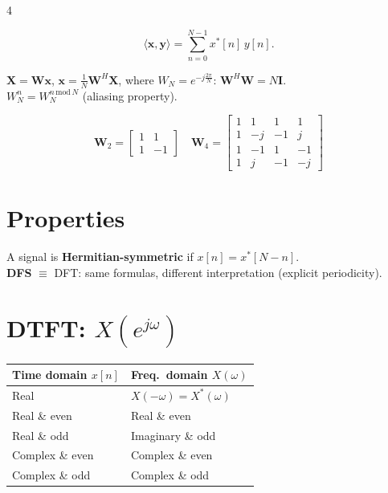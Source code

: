 \documentclass[8pt,a4paper,landscape]{extarticle}
\begin{document}
\begin{multicols*}{4}
\begin{thm}[title=Dot product in C]
\[
  \langle \mathbf{x},\mathbf{y}\rangle = \sum_{n=0}^{N-1} x^*[n]\,y[n].
\]
\end{thm}

\begin{prop}[title=DFT matrix form]
$\mathbf{X} = \mathbf{W}\mathbf{x}$, \quad $\mathbf{x} = \tfrac{1}{N}\mathbf{W}^H\mathbf{X}$, where $W_N = e^{-j\frac{2\pi}{N}}$:
$\mathbf{W}^H\mathbf{W} = N\mathbf{I}$.\\
$W_N^n = W_N^{n\,\mathrm{mod}\,N}$ (aliasing property).
\end{prop}

\[
  \mathbf{W}_2 = \begin{bmatrix}1&1\\1&-1\end{bmatrix} \quad
  \mathbf{W}_4 = \begin{bmatrix}1&1&1&1\\1&-j&-1&j\\1&-1&1&-1\\1&j&-1&-j\end{bmatrix}
\]

\section{Properties}
A signal is \textbf{Hermitian-symmetric} if $x[n]=x^*[N-n]$.\\
\textbf{DFS} $\equiv$ DFT: same formulas, different interpretation (explicit periodicity).

\section{DTFT: $X(e^{j\omega})$}

\begin{thm}[title=Symmetry summary]
\renewcommand{\arraystretch}{1}
\begin{tabularx}{\linewidth}{@{}XX@{}}
\toprule
\textbf{Time domain} $x[n]$ & \textbf{Freq.\ domain} $X(\omega)$ \\
\midrule
Real & $X(-\omega)=X^*(\omega)$ \\
Real \& even & Real \& even \\
Real \& odd & Imaginary \& odd \\
Complex \& even & Complex \& even \\
Complex \& odd & Complex \& odd \\
\bottomrule
\end{tabularx}
\end{thm}


\end{multicols*}
\end{document}
